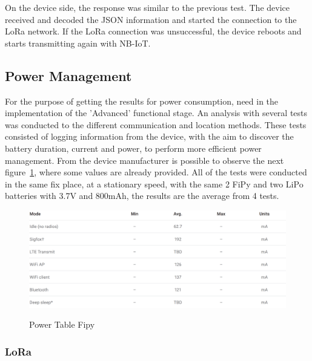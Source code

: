On the device side, the response was similar to the previous test. The device received and decoded the JSON information and started the connection to the LoRa network. If the LoRa connection was unsuccessful, the device reboots and starts transmitting again with NB-IoT.


\newpage
\subsection{Power Management}
\label{subsec:power_management}

For the purpose of getting the results for power consumption, need in the implementation of the 'Advanced'  functional stage. An analysis with several tests was conducted to the different communication  and location methods. These tests consisted of logging information from the device, with the aim to discover the battery duration, current and power, to perform  more efficient power management. From the device manufacturer is possible to observe the next figure~\ref{fig:PowerTableAll}, where some values are already provided. All of the tests were conducted in the same fix place, at a  stationary speed, with the same 2 FiPy and two LiPo batteries with 3.7V and 800mAh, the results are the average from 4 tests.

\begin{figure}[htbp]
  \centering
  
    {\includegraphics[width=0.93\linewidth]{Chapters/Figures/power1.PNG}}%
 
  \caption{Power Table Fipy~\cite{Microcontroller2017}}
  \label{fig:PowerTableAll}
\end{figure}


\subsubsection{LoRa}
\label{subsec:LoRa}

